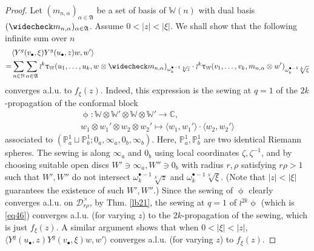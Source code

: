 \documentclass[12pt,a4paper,notitlepage]{article}
\theoremstyle{definition}
\theoremstyle{plain}
\newcommand{\fk}{\mathfrak}
\newcommand{\mc}{\mathcal}
\newcommand{\wch}{\widecheck}
\newcommand{\bk}[1]{\langle {#1}\rangle}
\newcommand{\blt}{\bullet}
\newcommand{\Wbb}{\mathbb W}
\newcommand{\Cbb}{\mathbb C}
\newcommand{\Nbb}{\mathbb N}
\newcommand{\Pbb}{\mathbb P}
\numberwithin{equation}{section}
\begin{document}
\begin{proof}
Let $(m_{n,\alpha})_{\alpha\in\fk A}$ be a set of basis of $\Wbb(n)$ with dual basis $(\wch m_{n,\alpha})_{\alpha\in\fk A}$. Assume $0<|z|<|\xi|$. We shall show that the following infinite sum over $n$
\begin{align}
&\bk{Y^g(v_\blt,\xi)Y^g(u_\blt,z)w,w'}\nonumber\\
=&\sum_{n\in\Nbb}\sum_{\alpha\in\fk A}\wr^k\uptau_\Wbb(u_1,\dots,u_k,w\otimes \wch m_{n,\alpha})_{\omega_k^{\blt-1}\sqrt[k]{z}}\cdot 	\wr^k\uptau_\Wbb(v_1,\dots,v_k,m_{n,\alpha}\otimes w')_{\omega_k^{\blt-1}\sqrt[k]{\xi}}\label{eq46}
\end{align}
converges a.l.u. to $f_\xi(z)$. Indeed, this expression is the sewing at $q=1$ of the $2k$-propagation of the conformal block
\begin{gather*}
\upphi:\Wbb\otimes\Wbb'\otimes\Wbb\otimes\Wbb'\rightarrow\Cbb,\\ w_1\otimes w_1'\otimes w_2	\otimes w_2'\mapsto \bk{w_1,w_1'}\cdot \bk{w_2,w_2'}
\end{gather*}
associated to $(\Pbb^1_a\sqcup\Pbb^1_b;0_a,\infty_a,0_b,\infty_b)$. Here, $\Pbb^1_a,\Pbb^1_b$ are two identical Riemann spheres.  The sewing is along $\infty_a$ and $0_b$ using local coordinates $\zeta,\zeta^{-1}$, and by choosing suitable open discs $W'\ni\infty_a,W''\ni 0_b$ with radius $r,\rho$ satisfying $r\rho>1$ such that $W',W''$ do not intersect $\omega_k^{\blt-1}\sqrt[k]{z}$ and $\omega_k^{\blt-1}\sqrt[k]{\xi}$. (Note that $|z|<|\xi|$ guarantees the existence of such $W',W''$.) Since the sewing of $\upphi$ clearly converges a.l.u. on $\mc D_{r\rho}^\times$, by Thm. \ref{lb21}, the sewing at $q=1$ of $\wr^{2k}\upphi$ (which is \eqref{eq46}) converges a.l.u. (for varying $z$) to the $2k$-propagation of the sewing, which is just $f_\xi(z)$. A similar argument shows that when $0<|\xi|<|z|$, $\bk{Y^g(u_\blt,z)Y^g(v_\blt,\xi)w,w'}$ converges a.l.u. (for varying $z$) to $f_\xi(z)$.




\end{proof}
\end{document}
